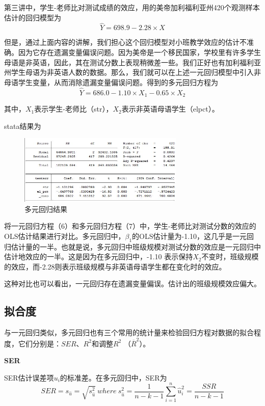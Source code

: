 \documentclass[cn,12pt,math=newtx,citestyle=gb7714-2015,bibstyle=gb7714-2015]{elegantbook}
\begin{document}
	第三讲中，学生-老师比对测试成绩的效应，用的美帝加利福利亚州420个观测样本估计的回归模型为
	\begin{equation}
		\hat{Y}=698.9-2.28\times{X}
	\end{equation}
	
	但是，通过上面内容的讲解，我们担心这个回归模型对小班教学效应的估计不准确。因为它存在遗漏变量偏误问题。因为美帝是一个移民国家，学校里有许多学生母语是非英语，因此，其在测试分数上表现稍微差一些。我们正好也有加利福利亚州学生母语为非英语人数的数据。那么，我们就可以在上述一元回归模型中引入非母语学生变量，从而消除遗漏变量偏误问题。得到的多元回归方程为
	\begin{equation}
		\hat{Y}=686.0-1.10\times{X_1}-0.65\times{X_2}
	\end{equation}
	
	其中，$X_1$表示学生-老师比（str），$X_2$表示非英语母语学生（elpct）。
	
	stata结果为
	\begin{figure}[htbp]
		\centering
		\includegraphics[width=0.7\textwidth]{mreg.jpg}
		\caption{多元回归结果}\label{fig:digit}
	\end{figure}
	
	将一元回归方程（6）和多元回归方程（7）中，学生-老师比对测试分数的效应的OLS估计结果进行对比。多元回归中，$\beta_1$的OLS估计量为-1.10，这几乎是一元回归估计量的一半。也就是说，多元回归中班级规模对测试分数的效应是一元回归中估计地效应的一半。这是因为在多元回归中，-1.10 表示保持$X_2$不变时，班级规模的效应，而-2.28则表示班级规模与非英语母语学生都在变化时的效应。
	
	这种对比也可以看出，一元回归存在遗漏变量偏误。估计出的班级规模效应偏大。
	
	\subsection{拟合度}
	与一元回归类似，多元回归也有三个常用的统计量来检验回归方程对数据的拟合程度，它们分别是：$SER$、$R^2$和调整$R^2$ （$\overline{R}^2$）。
	
	\textbf{SER}
	
	SER估计误差项$u_i$的标准差。在多元回归中，SER为
	\begin{equation}
		SER=s_{\hat{u}}=\sqrt{s_{\hat{u}}^2}~where~s_{\hat{u}}^2=\frac{1}{n-k-1}\sum_{i=1}^{n}{\hat{u}_i^2}=\frac{SSR}{n-k-1}
	\end{equation}
	
\end{document}
